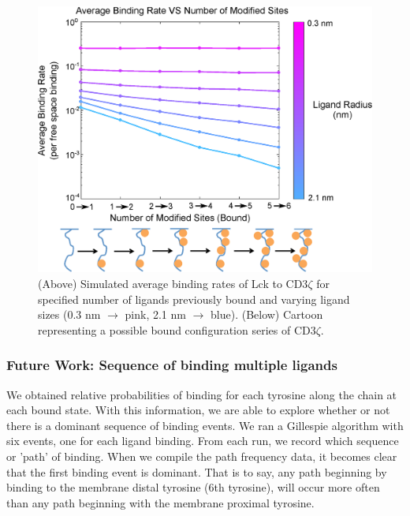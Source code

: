 \documentclass[../../AdvancementSummary.tex]{subfiles}
\begin{document}
\begin{figure}[H]
	\begin{center}
		\includegraphics[width=\linewidth]{ResultsFigures/CD3ZetaMultipleBindingMembraneOn/ibEqual/AvgBindVSTotalModified.eps}
		\caption{(Above) Simulated average binding rates of Lck to CD3$\zeta$ for specified number of ligands previously bound and varying ligand sizes (0.3 nm $\rightarrow$ pink, 2.1 nm $		\rightarrow$ blue). (Below) Cartoon representing a possible bound configuration series of CD3$\zeta$. \label{fig: SimBindMemOnibEqual} }
	\end{center}
\end{figure}


\subsubsection{Future Work: Sequence of binding multiple ligands}

We obtained relative probabilities of binding for each tyrosine along the chain at each bound state. With this information, we are able to explore whether or not there is a dominant sequence of binding events. We ran a Gillespie algorithm with six events, one for each ligand binding. From each run, we record which sequence or 'path' of binding. When we compile the path frequency data, it becomes clear that the first binding event is dominant. That is to say, any path beginning by binding to the membrane distal tyrosine (6th tyrosine), will occur more often than any path beginning with the membrane proximal tyrosine. 
\end{document}
